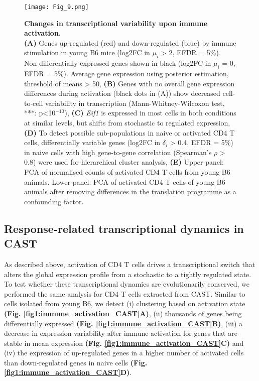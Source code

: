 \begin{figure}[!ht]
\centering
\texttt{[image: Fig\_9.png]}
\caption[Changes in transcriptional variability upon immune activation]{\textbf{Changes in transcriptional variability upon immune activation.}\\
\textbf{(A)} Genes up-regulated (red) and down-regulated (blue) by immune stimulation in young B6 mice (log2FC in $\mu_i$ > 2, EFDR = 5\%). 
Non-differentially expressed genes shown in black (log2FC in $\mu_i$ = 0, EFDR = 5\%). Average gene expression using posterior estimation, threshold of means > 50, 
\textbf{(B)} Genes with no overall gene expression differences during activation (black dots in (A)) show decreased cell-to-cell variability in transcription (Mann-Whitney-Wilcoxon test, ***: p<10$^{-10}$), 
\textbf{(C)} \textit{Eif1} is expressed in most cells in both conditions at similar levels, but shifts from stochastic to regulated expression, 
\textbf{(D)} To detect possible sub-populations in naive or activated CD4\plus{} T cells, differentially variable genes (log2FC in $\delta_i$ > 0.4, EFDR = 5\%) in naive cells with high gene-to-gene correlation (Spearman’s $\rho$ > 0.8) were used for hierarchical cluster analysis, 
\textbf{(E)} Upper panel: PCA of normalised counts of activated CD4\plus{} T cells from young B6 animals. 
Lower panel: PCA of activated CD4\plus{} T cells of young B6 animals after removing differences in the translation programme as a confounding factor.}
\label{fig1:immune_variability}
\end{figure}

\newpage

\subsection{Response-related transcriptional dynamics in CAST}

As described above, activation of CD4\plus{} T cells drives a transcriptional switch that alters the global expression profile from a stochastic to a tightly regulated state. 
To test whether these transcriptional dynamics are evolutionarily conserved, we performed the same analysis for CD4\plus{} T cells extracted from CAST. 
Similar to cells isolated from young B6, we detect (i) clustering based on activation state \textbf{(Fig. \ref{fig1:immune_activation_CAST}A)}, (ii)  thousands of genes being differentially expressed \textbf{(Fig. \ref{fig1:immune_activation_CAST}B)}, (iii) a decrease in expression variability after immune activation for genes that are stable in mean expression \textbf{(Fig. \ref{fig1:immune_activation_CAST}C)} and (iv) the expression of up-regulated genes in a higher number of activated cells than down-regulated genes in naive cells \textbf{(Fig. \ref{fig1:immune_activation_CAST}D)}.

